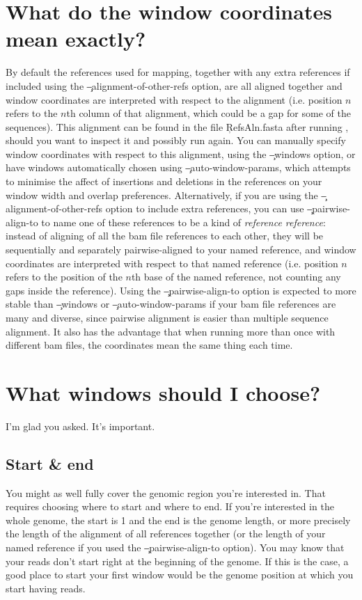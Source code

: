 \section{What do the window coordinates mean exactly?} \label{sec:CoordMeaning}
By default the references used for mapping, together with any extra references if included using the \c{--alignment-of-other-refs} option, are all aligned together and window coordinates are interpreted with respect to the alignment (i.e. position $n$ refers to the $n$th column of that alignment, which could be a gap for some of the sequences).
This alignment can be found in the file \c{RefsAln.fasta} after running \pmt, should you want to inspect it and possibly run again.
You can manually specify window coordinates with respect to this alignment, using the \c{--windows} option, or have windows automatically chosen using \c{--auto-window-params}, which attempts to minimise the affect of insertions and deletions in the references on your window width and overlap preferences.
Alternatively, if you are using the \c{--alignment-of-other-refs} option to include extra references, you can use \c{--pairwise-align-to} to name one of these references to be a kind of {\it reference reference}: instead of aligning of all the bam file references to each other, they will be sequentially and separately pairwise-aligned to your named reference, and window coordinates are interpreted with respect to that named reference (i.e. position $n$ refers to the position of the $n$th base of the named reference, not counting any gaps inside the reference).
Using the \c{--pairwise-align-to} option is expected to more stable than \c{--windows} or \c{--auto-window-params} if your bam file references are many and diverse, since pairwise alignment is easier than multiple sequence alignment.
It also has the advantage that when running \pmt more than once with different bam files, the coordinates mean the same thing each time.

\section{What windows should I choose?}
I'm glad you asked.
It's important.

\subsection{Start \& end}

You might as well fully cover the genomic region you're interested in.
That requires choosing where to start and where to end.
If you're interested in the whole genome, the start is 1 and the end is the genome length, or more precisely the length of the alignment of all references together (or the length of your named reference if you used the \c{--pairwise-align-to} option).
You may know that your reads don't start right at the beginning of the genome.
If this is the case, a good place to start your first window would be the genome position at which you start having reads.

